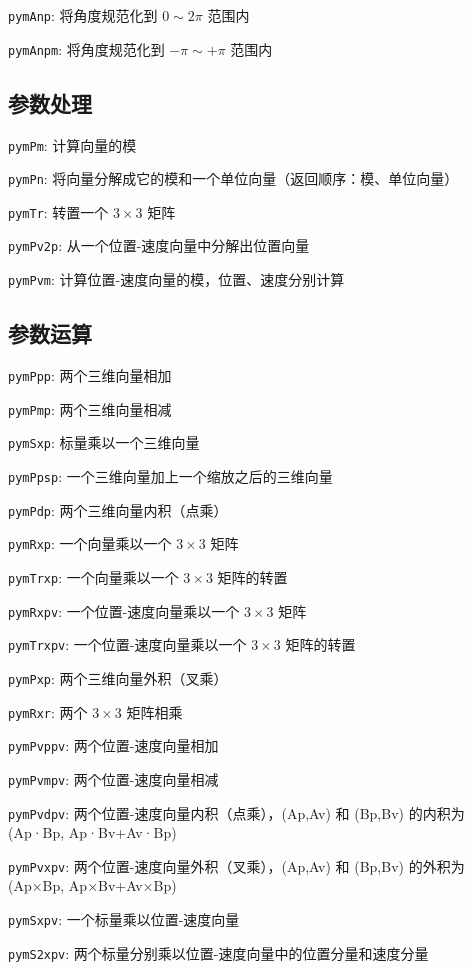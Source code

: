 \documentclass[11pt]{article}
\begin{document}
\texttt{pymAnp}: 将角度规范化到 $0\sim2\pi$ 范围内

\texttt{pymAnpm}: 将角度规范化到 $-\pi\sim+\pi$ 范围内

\subsection{参数处理}
\texttt{pymPm}: 计算向量的模

\texttt{pymPn}: 将向量分解成它的模和一个单位向量（返回顺序：模、单位向量）

\texttt{pymTr}: 转置一个 $3\times3$ 矩阵

\texttt{pymPv2p}: 从一个位置-速度向量中分解出位置向量

\texttt{pymPvm}: 计算位置-速度向量的模，位置、速度分别计算

\subsection{参数运算}
\texttt{pymPpp}: 两个三维向量相加

\texttt{pymPmp}: 两个三维向量相减

\texttt{pymSxp}: 标量乘以一个三维向量

\texttt{pymPpsp}: 一个三维向量加上一个缩放之后的三维向量

\texttt{pymPdp}: 两个三维向量内积（点乘）

\texttt{pymRxp}: 一个向量乘以一个 $3\times3$ 矩阵

\texttt{pymTrxp}: 一个向量乘以一个 $3\times3$ 矩阵的转置

\texttt{pymRxpv}: 一个位置-速度向量乘以一个 $3\times3$ 矩阵

\texttt{pymTrxpv}: 一个位置-速度向量乘以一个 $3\times3$ 矩阵的转置

\texttt{pymPxp}: 两个三维向量外积（叉乘）

\texttt{pymRxr}: 两个 $3\times3$ 矩阵相乘

\texttt{pymPvppv}: 两个位置-速度向量相加

\texttt{pymPvmpv}: 两个位置-速度向量相减

\texttt{pymPvdpv}: 两个位置-速度向量内积（点乘），(Ap,Av) 和 (Bp,Bv) 的内积为
(Ap·Bp, Ap·Bv+Av·Bp)

\texttt{pymPvxpv}: 两个位置-速度向量外积（叉乘），(Ap,Av) 和 (Bp,Bv) 的外积为
(Ap×Bp, Ap×Bv+Av×Bp)

\texttt{pymSxpv}: 一个标量乘以位置-速度向量

\texttt{pymS2xpv}: 两个标量分别乘以位置-速度向量中的位置分量和速度分量
\end{document}
